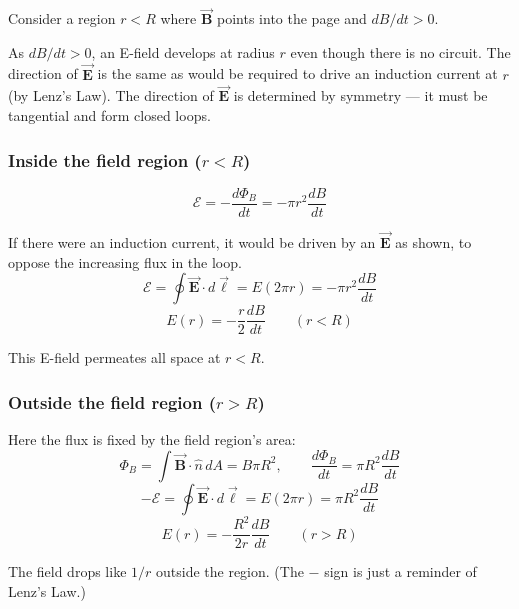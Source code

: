 \documentclass[11pt]{report}
\newcommand{\vbf}[1]{\vec{\mathbf{#1}}}
\newcommand{\nhat}{\hat{n}}
\begin{document}
Consider a region $r < R$ where $\vbf{B}$ points into the page and $dB/dt > 0$.

As $dB/dt > 0$, an E-field develops at radius $r$ even though there is no circuit. The direction of $\vbf{E}$ is the same as would be required to drive an induction current at $r$ (by Lenz's Law). The direction of $\vbf{E}$ is determined by symmetry --- it must be tangential and form closed loops.

\subsubsection*{Inside the field region ($r < R$)}

\begin{equation}
\mathcal{E} = -\frac{d\Phi_B}{dt} = -\pi r^2 \frac{dB}{dt}
\end{equation}

If there were an induction current, it would be driven by an $\vbf{E}$ as shown, to oppose the increasing flux in the loop.
\begin{equation}
\mathcal{E} = \oint \vbf{E} \cdot d\vbf{\ell} = E(2\pi r) = -\pi r^2 \frac{dB}{dt}
\end{equation}
\begin{equation}
\boxed{E(r) = -\frac{r}{2} \frac{dB}{dt} \qquad (r < R)}
\end{equation}

This E-field permeates all space at $r < R$.

\subsubsection*{Outside the field region ($r > R$)}

Here the flux is fixed by the field region's area:
\begin{equation}
\Phi_B = \int \vbf{B} \cdot \nhat \, dA = B \pi R^2, \qquad \frac{d\Phi_B}{dt} = \pi R^2 \frac{dB}{dt}
\end{equation}
\begin{equation}
-\mathcal{E} = \oint \vbf{E} \cdot d\vbf{\ell} = E(2\pi r) = \pi R^2 \frac{dB}{dt}
\end{equation}
\begin{equation}
\boxed{E(r) = -\frac{R^2}{2r}\frac{dB}{dt} \qquad (r > R)}
\end{equation}

The field drops like $1/r$ outside the region. (The $-$ sign is just a reminder of Lenz's Law.)
\end{document}
